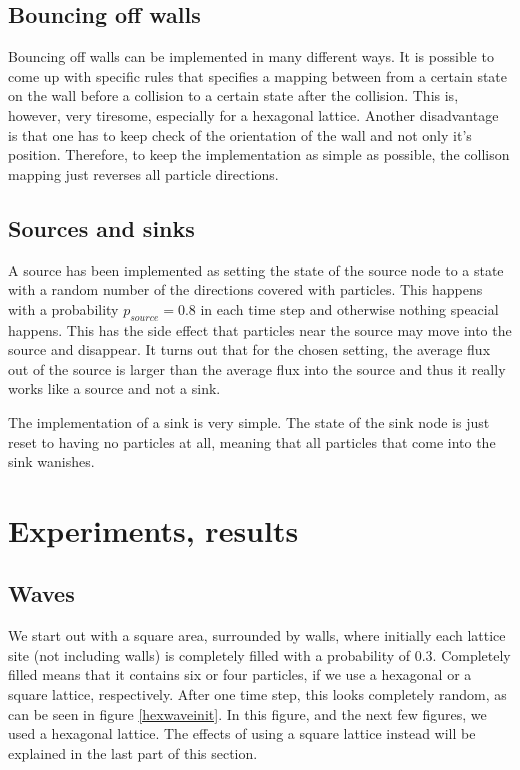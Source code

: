 \documentclass[12pt,a4paper]{article}
\begin{document}
\subsection{Bouncing off walls}
Bouncing off walls can be implemented in many different ways. It is possible to
come up with specific rules that specifies a mapping between from a certain state
on the wall before a collision to a certain state after the collision. This is, 
however, very tiresome, especially for a hexagonal lattice. Another disadvantage
is that one has to keep check of the orientation of the wall and not only it's 
position. Therefore, to keep the implementation as simple as possible, the collison
mapping just reverses all particle directions.

\subsection{Sources and sinks}
A source has been implemented as setting the state of the source node to a state
with a random number of the directions covered with particles. This happens with 
a probability $p_{source}=0.8$ in each time step and otherwise nothing speacial
happens. This has the side effect that particles near the source may move into the
source and disappear. It turns out that for the chosen setting, the average flux
out of the source is larger than the average flux into the source and thus it really
works like a source and not a sink.

The implementation of a sink is very simple. The state of the sink node is just reset
to having no particles at all, meaning that all particles that come into the sink 
wanishes. 


\section{Experiments, results}
\label{sec:exp}
\subsection{Waves}
We start out with a square area, surrounded by walls, where initially each lattice site (not including walls)
is completely filled with a probability of 0.3. Completely filled means that it contains six or
four particles, if we use a hexagonal or a square lattice, respectively. After one time step,
this looks completely random, as can be seen in figure \ref{hexwaveinit}. In this figure, and the
next few figures, we used a hexagonal lattice. The effects of using a square lattice instead will be
explained in the last part of this section.
\end{document}
